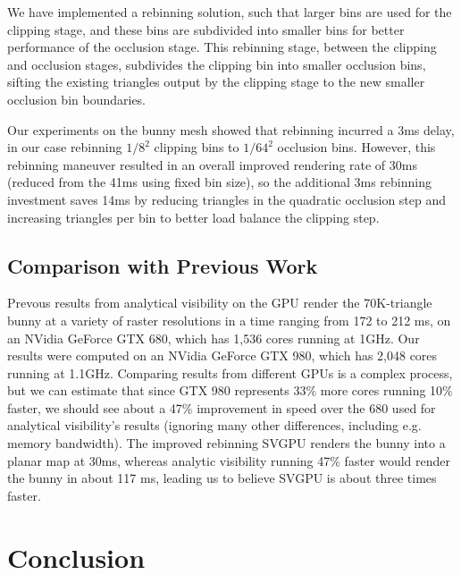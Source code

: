 \documentclass[review]{acmsiggraph}
\begin{document}
We have implemented a rebinning solution, such that larger bins are used for
the clipping stage, and these bins are subdivided into smaller bins for better
performance of the occlusion stage. This rebinning stage, between the clipping
and occlusion stages, subdivides the clipping bin into smaller occlusion bins,
sifting the existing triangles output by the clipping stage to the new
smaller occlusion bin boundaries.

Our experiments on the bunny mesh showed that rebinning incurred a 3ms delay,
in our case rebinning $1/8^2$ clipping bins to $1/64^2$ occlusion bins.
However, this rebinning maneuver resulted in an overall improved rendering
rate of 30ms (reduced from the 41ms using fixed bin size), so the additional
3ms rebinning investment saves 14ms by reducing triangles in the quadratic
occlusion step and increasing triangles per bin to better load balance the
clipping step.

\subsection{Comparison with Previous Work}

Prevous results from analytical visibility on the GPU \cite{auzinger2013}
render the 70K-triangle bunny at a variety of raster resolutions in a time
ranging from 172 to 212 ms, on an NVidia GeForce GTX 680, which has 1,536
cores running at 1GHz. Our results were computed on an NVidia GeForce GTX 980,
which has 2,048 cores running at 1.1GHz. Comparing results from different
GPUs is a complex process, but we can estimate that since GTX 980 represents
33\% more cores running 10\% faster, we should see about a 47\% improvement in
speed over the 680 used for analytical visibility's results (ignoring many
other differences, including e.g. memory bandwidth). The improved rebinning
SVGPU renders the bunny into a planar map at 30ms, whereas analytic visibility
running 47\% faster would render the bunny in about 117 ms, leading us to
believe SVGPU is about three times faster.
 
\section{Conclusion}
\end{document}
